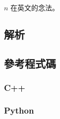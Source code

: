 \documentclass[a4paper,10pt]{article}
\begin{document}
$n$ 在英文的念法。

\subsection{解析}

\subsection{參考程式碼}

\subsubsection{C++}



\subsubsection{Python}


\end{document}
